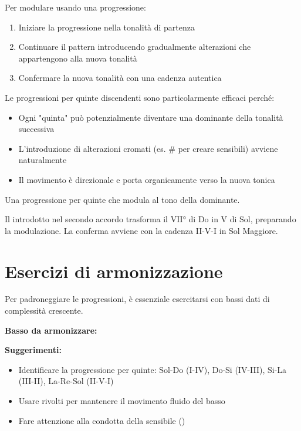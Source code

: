 \begin{regola}
	\label{reg:modulazione_progressioni}
	Per modulare usando una progressione:
	
	\begin{enumerate}
		\item Iniziare la progressione nella tonalità di partenza
		\item Continuare il pattern introducendo gradualmente alterazioni che appartengono alla nuova tonalità
		\item Confermare la nuova tonalità con una cadenza autentica
	\end{enumerate}
	
	Le progressioni per quinte discendenti sono particolarmente efficaci perché:
	\begin{itemize}
		\item Ogni "quinta" può potenzialmente diventare una dominante della tonalità successiva
		\item L'introduzione di alterazioni cromati (es. \# per creare sensibili) avviene naturalmente
		\item Il movimento è direzionale e porta organicamente verso la nuova tonica
	\end{itemize}
\end{regola}

\begin{esempio}
	\label{ex:progressione_modulante}
	Una progressione per quinte che modula al tono della dominante.
	
	Il \Fadiesis  introdotto nel secondo accordo trasforma il VII° di Do in V di Sol, preparando la modulazione. La conferma avviene con la cadenza II-V-I in Sol Maggiore.
\end{esempio}

\section{Esercizi di armonizzazione}
\label{sec:esercizi_progressioni}

Per padroneggiare le progressioni, è essenziale esercitarsi con bassi dati di complessità crescente.

\begin{esempio}
	\label{ex:esercizio_1}
	
	\textbf{Basso da armonizzare:}
	
	\textbf{Suggerimenti:}
	\begin{itemize}
		\item Identificare la progressione per quinte: Sol-Do (I-IV), Do-Si (IV-III), Si-La (III-II), La-Re-Sol (II-V-I)
		\item Usare rivolti per mantenere il movimento fluido del basso
		\item Fare attenzione alla condotta della sensibile (\Fadiesis )
	\end{itemize}
\end{esempio}


